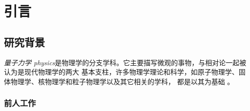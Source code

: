 \chapter{引言}


\section{研究背景}

\emph{量子力学 physics}是物理学的分支学科。它主要描写微观的事物，与相对论一起被认为是现代物理学的两大
基本支柱，许多物理学理论和科学，如原子物理学、固体物理学、核物理学和粒子物理学以及其它相关的学科，
都是以其为基础 \parencite{曾谨言2013量子力学,feynman2011feynman}。



\subsection{前人工作}


